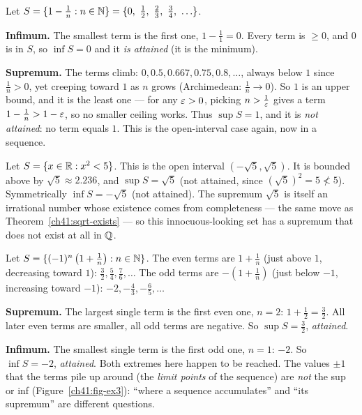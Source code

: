 \begin{example}
\label{ch41:ex1}
Let $S = \set{1 - \tfrac1n : n\in\N} = \set{0,\ \tfrac12,\ \tfrac23,\ \tfrac34,\ \ldots}$.

\textbf{Infimum.} The smallest term is the first one, $1-\frac11 = 0$. Every term is
$\ge 0$, and $0$ is in $S$, so $\inf S = 0$ and it \emph{is attained} (it is the minimum).

\textbf{Supremum.} The terms climb: $0,0.5,0.667,0.75,0.8,\ldots$, always below $1$ since
$\frac1n>0$, yet creeping toward $1$ as $n$ grows (Archimedean: $\frac1n\to0$). So $1$ is
an upper bound, and it is the least one --- for any $\varepsilon>0$, picking $n>\frac1{\varepsilon}$ gives
a term $1-\frac1n > 1-\varepsilon$, so no smaller ceiling works. Thus $\sup S = 1$, and it is
\emph{not attained}: no term equals $1$. This is the open-interval case again, now in
a sequence.
\end{example}

\begin{example}
\label{ch41:ex2}
Let $S = \{x\in\mathbb{R} : x^2 < 5\}$. This is the open interval $(-\sqrt5,\sqrt5)$. It is
bounded above by $\sqrt5\approx2.236$, and $\sup S=\sqrt5$ (not attained, since
$(\sqrt5)^2=5\not<5$). Symmetrically $\inf S = -\sqrt5$ (not attained). The supremum
$\sqrt5$ is itself an irrational number whose existence comes from completeness --- the same move
as Theorem~\ref{ch41:sqrt-exists} --- so this innocuous-looking set has a supremum that
does not exist at all in $\mathbb{Q}$.
\end{example}

\begin{example}
\label{ch41:ex3}
Let $S = \{(-1)^n\left(1+\tfrac1n\right) : n\in\mathbb{N}\}$. The even terms are
$1+\frac1n$ (just above $1$, decreasing toward $1$): $\frac32, \frac54, \frac76,\ldots$
The odd terms are $-(1+\frac1n)$ (just below $-1$, increasing toward $-1$):
$-2, -\frac43, -\frac65,\ldots$

\textbf{Supremum.} The largest single term is the first even one, $n=2$: $1+\frac12=\frac32$.
All later even terms are smaller, all odd terms are negative. So $\sup S = \frac32$,
\emph{attained}.

\textbf{Infimum.} The smallest single term is the first odd one, $n=1$: $-2$. So
$\inf S = -2$, \emph{attained}. Both extremes here happen to be reached. The values
$\pm1$ that the terms pile up around (the \emph{limit points} of the sequence) are \emph{not}
the sup or inf (Figure~\ref{ch41:fig-ex3}): ``where a sequence accumulates'' and ``its
supremum'' are different questions.
\end{example}

